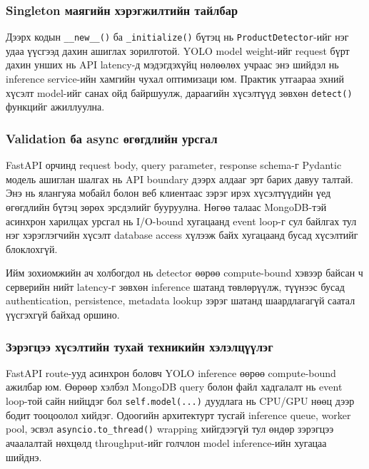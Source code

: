 \subsubsection{Singleton маягийн хэрэгжилтийн тайлбар}

Дээрх кодын \texttt{\_\_new\_\_()} ба \texttt{\_initialize()} бүтэц нь \texttt{ProductDetector}-ийг нэг удаа үүсгээд дахин ашиглах зорилготой. YOLO model weight-ийг request бүрт дахин унших нь API latency-д мэдэгдэхүйц нөлөөлөх учраас энэ шийдэл нь inference service-ийн хамгийн чухал оптимизаци юм. Практик утгаараа эхний хүсэлт model-ийг санах ойд байршуулж, дараагийн хүсэлтүүд зөвхөн \texttt{detect()} функцийг ажиллуулна.

\subsubsection{Validation ба async өгөгдлийн урсгал}

FastAPI орчинд request body, query parameter, response schema-г Pydantic модель ашиглан шалгах нь API boundary дээрх алдааг эрт барих давуу талтай. Энэ нь ялангуяа мобайл болон веб клиентаас зэрэг ирэх хүсэлтүүдийн үед өгөгдлийн бүтэц зөрөх эрсдэлийг бууруулна. Нөгөө талаас MongoDB-тэй асинхрон харилцах урсгал нь I/O-bound хугацаанд event loop-г сул байлгах тул нэг хэрэглэгчийн хүсэлт database access хүлээж байх хугацаанд бусад хүсэлтийг блоклохгүй.

Ийм зохиомжийн ач холбогдол нь detector өөрөө compute-bound хэвээр байсан ч серверийн нийт latency-г зөвхөн inference шатанд төвлөрүүлж, түүнээс бусад authentication, persistence, metadata lookup зэрэг шатанд шаардлагагүй саатал үүсгэхгүй байхад оршино.

\subsubsection{Зэрэгцээ хүсэлтийн тухай техникийн хэлэлцүүлэг}

FastAPI route-ууд асинхрон боловч YOLO inference өөрөө compute-bound ажилбар юм. Өөрөөр хэлбэл MongoDB query болон файл хадгалалт нь event loop-той сайн нийцдэг бол \texttt{self.model(...)} дуудлага нь CPU/GPU нөөц дээр бодит тооцоолол хийдэг. Одоогийн архитектурт тусгай inference queue, worker pool, эсвэл \texttt{asyncio.to\_thread()} wrapping хийгдээгүй тул өндөр зэрэгцээ ачаалалтай нөхцөлд throughput-ийг голчлон model inference-ийн хугацаа шийднэ.

